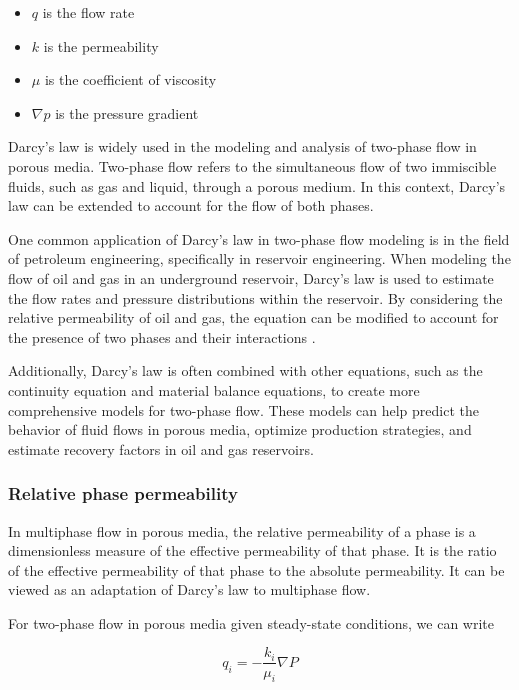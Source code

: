 		\begin{itemize}
			\item $q$ is the flow rate
			\item $k$ is the permeability 
			\item $\mu$ is the coefficient of viscosity
			\item $\nabla p$ is the pressure gradient
		\end{itemize}

		Darcy's law is widely used in the modeling and analysis of two-phase flow in porous media. Two-phase flow refers to the simultaneous flow of two immiscible fluids, such as gas and liquid, through a porous medium. In this context, Darcy's law can be extended to account for the flow of both phases.
		
		One common application of Darcy's law in two-phase flow modeling is in the field of petroleum engineering, specifically in reservoir engineering. When modeling the flow of oil and gas in an underground reservoir, Darcy's law is used to estimate the flow rates and pressure distributions within the reservoir. By considering the relative permeability of oil and gas, the equation can be modified to account for the presence of two phases and their interactions \cite{uhlmann2005immersed}.
		
		Additionally, Darcy's law is often combined with other equations, such as the continuity equation and material balance equations, to create more comprehensive models for two-phase flow. These models can help predict the behavior of fluid flows in porous media, optimize production strategies, and estimate recovery factors in oil and gas reservoirs. \cite{hubbert1956darcy}
	
	\subsubsection{Relative phase permeability}
		In multiphase flow in porous media, the relative permeability of a phase is a dimensionless measure of the effective permeability of that phase. It is the ratio of the effective permeability of that phase to the absolute permeability. It can be viewed as an adaptation of Darcy's law to multiphase flow.

		For two-phase flow in porous media given steady-state conditions, we can write

		\begin{equation}
			q_{i} = -\frac{k_{i}}{\mu_{i}}\nabla P
		\end{equation}
		
